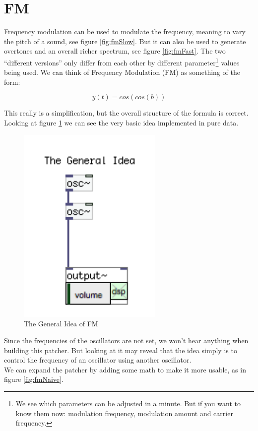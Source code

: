 \section{FM} %
\label{sub:FM}

Frequency modulation can be used to modulate the frequency, meaning to vary the pitch of a sound, see figure \ref{fig:fmSlow}. But it can also be used to generate overtones and an overall richer spectrum, see figure \ref{fig:fmFast}. The two ``different versions'' only differ from each other by different parameter\footnote{We see which parameters can be adjusted in a minute. But if you want to know them now: modulation frequency, modulation amount and carrier frequency.} values being used.
We can think of Frequency Modulation (FM) as something of the form:

\begin{equation}
	y(t) = cos(cos(b))
\end{equation}

This really is a simplification, but the overall structure of the formula is correct.
Looking at figure \ref{fig:fmIdea} we can see the very basic idea implemented in pure data.
\begin{figure}[H]
	\begin{center}
		\includegraphics[width = 7cm]{img/FMgeneral.png}
		\caption{The General Idea of FM}
		\label{fig:fmIdea}
	\end{center}
\end{figure}

Since the frequencies of the oscillators are not set, we won't hear anything when building this patcher. But looking at it may reveal that the idea simply is to control the frequency of an oscillator using another oscillator.\\
We can expand the patcher by adding some math to make it more usable, as in figure \ref{fig:fmNaive}.

